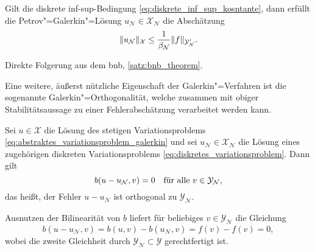 \documentclass[../main.tex]{subfiles}
\begin{document}
\begin{Satz}
    \label{satz:galerkin_stabilitaet}
    Gilt die diskrete inf-sup-Bedingung \cref{eq:diskrete_inf_sup_kosntante}, dann erfüllt die Petrov"=Galerkin"=Lösung $u_{\mathcal N} \in \mathcal X_{\mathcal N}$ die Abschätzung
    \begin{equation}
        \label{eq:galerkin_statibilitaet}
        \norm{u_{\mathcal N}}_{\mathcal X} \leq \frac{1}{\beta_{\mathcal N}} \norm{f}_{\mathcal Y_{\mathcal N}'}.
    \end{equation}

    \begin{Beweis}
        Direkte Folgerung aus dem \acl{bnb}, \cref{satz:bnb_theorem}.
    \end{Beweis}
\end{Satz}

Eine weitere, äußerst nützliche Eigenschaft der Galerkin"=Verfahren ist die sogenannte Galerkin"=Orthogonalität, welche zusammen mit obiger Stabilitätsaussage zu einer Fehlerabschätzung verarbeitet werden kann.

\begin{Lemma}
    \label{lemma:galerkin_orthogonalitaet}
    Sei $u \in \mathcal X$ die Lösung des stetigen Variationsproblems \cref{eq:abstraktes_variationsproblem_galerkin} und sei $u_{\mathcal N} \in \mathcal X_{\mathcal N}$ die Lösung eines zugehörigen diskreten Variationsproblems \cref{eq:diskretes_variationsproblem}.
    Dann gilt
    \begin{equation}
        \label{eq:galerkin_orthogonalitaet}
        b(u - u_{\mathcal N}, v) = 0 \quad \fa v \in \mathcal Y_{\mathcal N},
    \end{equation}
    das heißt, der Fehler $u - u_{\mathcal N}$ ist orthogonal zu $\mathcal Y_{\mathcal N}$.

    \begin{Beweis}
        Ausnutzen der Bilinearität von $b$ liefert für beliebiges $v \in \mathcal Y_{\mathcal N}$ die Gleichung
        \begin{equation}
            b(u - u_{\mathcal N}, v) = b(u, v) - b(u_{\mathcal N}, v) = f(v) - f(v) = 0,
        \end{equation}
        wobei die zweite Gleichheit durch $\mathcal Y_{\mathcal N} \subset \mathcal Y$ gerechtfertigt ist.
    \end{Beweis}
\end{Lemma}
\end{document}
